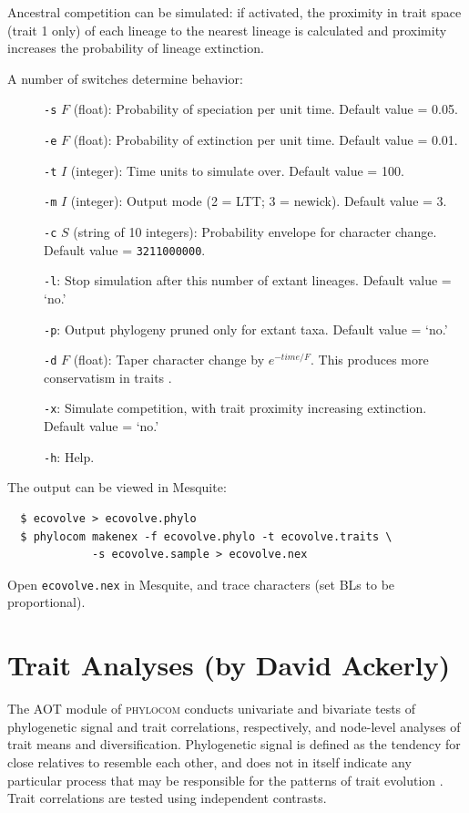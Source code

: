 \documentclass[12pt,letterpaper]{article}
\begin{document}
Ancestral competition can be simulated: if activated, the proximity in
trait space (trait 1 only) of each lineage to the nearest lineage is
calculated and proximity increases the probability of lineage
extinction.

A number of switches determine behavior:

\begin{description}
\item[] \verb|-s| $F$ (float): Probability of speciation per unit
  time. Default value = 0.05.
\item[] \verb|-e| $F$ (float): Probability of extinction per unit
  time. Default value = 0.01.
\item[] \verb|-t| $I$ (integer): Time units to simulate over. Default
  value = 100.
\item[] \verb|-m| $I$ (integer): Output mode (2 = LTT; 3 =
  newick). Default value = 3.
\item[] \verb|-c| $S$ (string of 10 integers): Probability envelope
  for character change. Default value = \verb|3211000000|.
\item[] \verb|-l|: Stop simulation after this number of extant
  lineages. Default value = `no.'
\item[] \verb|-p|: Output phylogeny pruned only for extant taxa.  Default value = `no.'
\item[] \verb|-d| $F$ (float): Taper character change by
  $e^{-time/F}$.  This produces more conservatism in traits
  \citep[see][]{kraft2007tra}.
\item[] \verb|-x|: Simulate competition, with trait proximity
  increasing extinction. Default value = `no.'
\item[] \verb|-h|: Help.
\end{description}

The output can be viewed in Mesquite:
\begin{verbatim}
  $ ecovolve > ecovolve.phylo
  $ phylocom makenex -f ecovolve.phylo -t ecovolve.traits \
             -s ecovolve.sample > ecovolve.nex
\end{verbatim}
Open \verb|ecovolve.nex| in Mesquite, and trace characters (set BLs to
be proportional).

\section{Trait Analyses (by David Ackerly)}

The AOT module of {\scshape phylocom} conducts univariate and bivariate
tests of phylogenetic signal and trait correlations, respectively, and
node-level analyses of trait means and diversification. Phylogenetic
signal is defined as the tendency for close relatives to resemble each
other, and does not in itself indicate any particular process that may
be responsible for the patterns of trait evolution
\citep{blomberg2002tem}. Trait correlations are tested using
independent contrasts.
\end{document}
